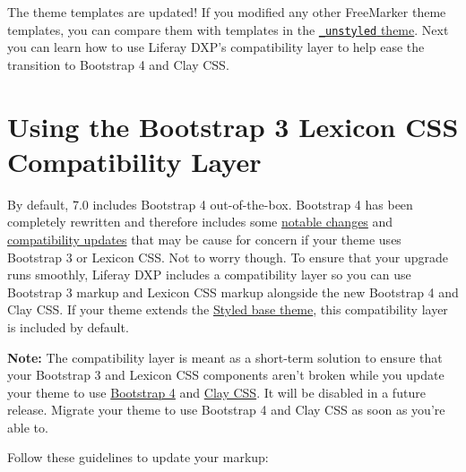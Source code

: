 The theme templates are updated! If you modified any other FreeMarker
theme templates, you can compare them with templates in the
\href{https://github.com/liferay/liferay-portal/tree/7.2.x/modules/apps/frontend-theme/frontend-theme-unstyled/src/main/resources/META-INF/resources/_unstyled/templates}{\texttt{\_unstyled}
theme}. Next you can learn how to use Liferay DXP's compatibility layer
to help ease the transition to Bootstrap 4 and Clay CSS.

\chapter{Using the Bootstrap 3 Lexicon CSS Compatibility
Layer}\label{using-the-bootstrap-3-lexicon-css-compatibility-layer}

By default, 7.0 includes Bootstrap 4 out-of-the-box. Bootstrap 4 has
been completely rewritten and therefore includes some
\href{https://getbootstrap.com/docs/4.3/migration/}{notable changes} and
\href{https://getbootstrap.com/docs/4.3/getting-started/introduction/}{compatibility
updates} that may be cause for concern if your theme uses Bootstrap 3 or
Lexicon CSS. Not to worry though. To ensure that your upgrade runs
smoothly, Liferay DXP includes a compatibility layer so you can use
Bootstrap 3 markup and Lexicon CSS markup alongside the new Bootstrap 4
and Clay CSS. If your theme extends the
\href{https://github.com/liferay/liferay-portal/tree/7.2.x/modules/apps/frontend-theme/frontend-theme-styled}{Styled
base theme}, this compatibility layer is included by default.

\noindent\hrulefill

\textbf{Note:} The compatibility layer is meant as a short-term solution
to ensure that your Bootstrap 3 and Lexicon CSS components aren't broken
while you update your theme to use
\href{https://getbootstrap.com/docs/4.3/migration/}{Bootstrap 4} and
\href{https://clayui.com/docs/css-framework/scss.html}{Clay CSS}. It
will be disabled in a future release. Migrate your theme to use
Bootstrap 4 and Clay CSS as soon as you're able to.

\noindent\hrulefill

Follow these guidelines to update your markup:

